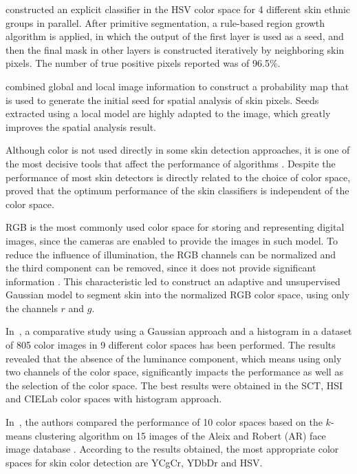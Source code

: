 \citet{naji:12} constructed an explicit classifier in the HSV color space for 4 different skin ethnic groups in parallel. After primitive segmentation, a rule-based region growth algorithm is applied, in which the output of the first layer is used as a seed, and then the final mask in other layers is constructed iteratively by neighboring skin pixels. The number of true positive pixels reported was of 96.5\%.

\citet{kawulok:13} combined global and local image information to construct a probability map that is used to generate the initial seed for spatial analysis of skin pixels. Seeds extracted using a local model are highly adapted to the image, which greatly improves the spatial analysis result.

Although color is not used directly in some skin detection approaches, it is one of the most decisive tools that affect the performance of algorithms \citep{mahmoodi:16}. Despite the performance of most skin detectors is directly related to the choice of color space, \citet{albiol:01} proved that the optimum performance of the skin classifiers is independent of the color space.

RGB is the most commonly used color space for storing and representing digital images, since the cameras are enabled to provide the images in such model. To reduce the influence of illumination, the RGB channels can be normalized and the third component can be removed, since it does not provide significant information \citep{kakumanu:07}. This characteristic led \citet{bergasa:00} to construct an adaptive and unsupervised Gaussian model to segment skin into the normalized RGB color space, using only the channels $r$ and $g$.

In~\citet{jayaram:04}, a comparative study using a Gaussian approach and a histogram in a dataset of 805 color images in 9 different color spaces has been performed. The results revealed that the absence of the luminance component, which means using only two channels of the color space, significantly impacts the performance as well as the selection of the color space. The best results were obtained in the SCT, HSI and CIELab color spaces with histogram approach.

In~\citet{chaves:10}, the authors compared the performance of 10 color spaces based on the $k$-means clustering algorithm on 15 images of the Aleix and Robert (AR) face image database \citep{ar-face-database:98}. According to the results obtained, the most appropriate color spaces for skin color detection are YCgCr, YDbDr and HSV.

